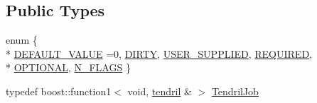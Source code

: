 \subsection*{Public Types}
\begin{DoxyCompactItemize}
\item 
enum \{ \\*
\hyperlink{classecto_1_1tendril_ab63b76909681783917fcb55e3c89f4aca122dd16c5a22a6e22c7caedf7be1d92f}{D\+E\+F\+A\+U\+L\+T\+\_\+\+V\+A\+L\+U\+E} =0, 
\hyperlink{classecto_1_1tendril_ab63b76909681783917fcb55e3c89f4aca7ae45e8526726df642f14c19db78564d}{D\+I\+R\+T\+Y}, 
\hyperlink{classecto_1_1tendril_ab63b76909681783917fcb55e3c89f4aca26dbd8778d8007b845bb247f6ce87ff8}{U\+S\+E\+R\+\_\+\+S\+U\+P\+P\+L\+I\+E\+D}, 
\hyperlink{classecto_1_1tendril_ab63b76909681783917fcb55e3c89f4acac686a7ccc1227f1ae09d79536683136b}{R\+E\+Q\+U\+I\+R\+E\+D}, 
\\*
\hyperlink{classecto_1_1tendril_ab63b76909681783917fcb55e3c89f4aca4906c6f7c63b6934ea683ea05716abee}{O\+P\+T\+I\+O\+N\+A\+L}, 
\hyperlink{classecto_1_1tendril_ab63b76909681783917fcb55e3c89f4aca8748e76437a722b0cfb3652fefd47d67}{N\+\_\+\+F\+L\+A\+G\+S}
 \}
\item 
typedef boost\+::function1$<$ void, \hyperlink{classecto_1_1tendril}{tendril} \& $>$ \hyperlink{classecto_1_1tendril_ad312bffc767516bd2340d02cd9e218ae}{Tendril\+Job}
\end{DoxyCompactItemize}
